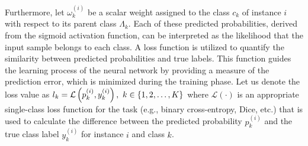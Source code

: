 \documentclass[authoryear,preprint,review,12pt]{elsarticle}
\begin{document}
Furthermore, let $\omega_k^{(i)} $ be a scalar weight assigned to the class $c_k $ of instance $i $ with respect to its parent class $\Lambda_k$.
Each of these predicted probabilities, derived from the sigmoid activation function, can be interpreted as the likelihood that the input sample belongs to each class. A loss function is utilized to quantify the similarity between predicted probabilities and true labels. This function guides the learning process of the neural network by providing a measure of the prediction error, which is minimized during the training phase.
Let us denote the loss value as $l_k = \mathcal{L} \left(p_k^{(i)},y_k^{(i)}\right),\hspace{0.33em}k \in \{1,2,\dots,K\} $ where $\mathcal{L}(\cdot) $ is an appropriate single-class loss function for the task (e.g., binary cross-entropy, Dice, etc.) that is used to calculate the difference between the predicted probability $p_k^{(i)} $ and the true class label $y_k^{(i)} $ for instance $i$ and class $k $.
%
\end{document}

